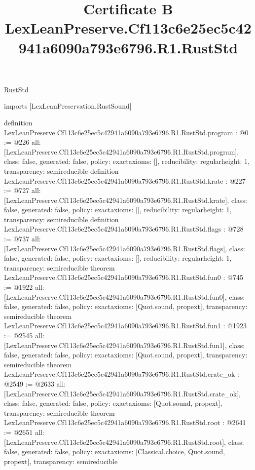 \begin{lexlean}{RustStd}
\title{Certificate B LexLeanPreserve.Cf113c6e25ec5c42941a6090a793e6796.R1.RustStd}
\begin{coremodule}
imports [LexLeanPreservation.RustSound]

definition LexLeanPreserve.Cf113c6e25ec5c42941a6090a793e6796.R1.RustStd.program : @0 := @226 {
  all: [LexLeanPreserve.Cf113c6e25ec5c42941a6090a793e6796.R1.RustStd.program],
  class: false,
  generated: false,
  policy: exact{axioms: []},
  reducibility: regular{height: 1},
  transparency: semireducible
}
definition LexLeanPreserve.Cf113c6e25ec5c42941a6090a793e6796.R1.RustStd.krate : @227 := @727 {
  all: [LexLeanPreserve.Cf113c6e25ec5c42941a6090a793e6796.R1.RustStd.krate],
  class: false,
  generated: false,
  policy: exact{axioms: []},
  reducibility: regular{height: 1},
  transparency: semireducible
}
definition LexLeanPreserve.Cf113c6e25ec5c42941a6090a793e6796.R1.RustStd.flags : @728 := @737 {
  all: [LexLeanPreserve.Cf113c6e25ec5c42941a6090a793e6796.R1.RustStd.flags],
  class: false,
  generated: false,
  policy: exact{axioms: []},
  reducibility: regular{height: 1},
  transparency: semireducible
}
theorem LexLeanPreserve.Cf113c6e25ec5c42941a6090a793e6796.R1.RustStd.fun0 : @745 := @1922 {
  all: [LexLeanPreserve.Cf113c6e25ec5c42941a6090a793e6796.R1.RustStd.fun0],
  class: false,
  generated: false,
  policy: exact{axioms: [Quot.sound, propext]},
  transparency: semireducible
}
theorem LexLeanPreserve.Cf113c6e25ec5c42941a6090a793e6796.R1.RustStd.fun1 : @1923 := @2545 {
  all: [LexLeanPreserve.Cf113c6e25ec5c42941a6090a793e6796.R1.RustStd.fun1],
  class: false,
  generated: false,
  policy: exact{axioms: [Quot.sound, propext]},
  transparency: semireducible
}
theorem LexLeanPreserve.Cf113c6e25ec5c42941a6090a793e6796.R1.RustStd.crate_ok : @2549 := @2633 {
  all: [LexLeanPreserve.Cf113c6e25ec5c42941a6090a793e6796.R1.RustStd.crate_ok],
  class: false,
  generated: false,
  policy: exact{axioms: [Quot.sound, propext]},
  transparency: semireducible
}
theorem LexLeanPreserve.Cf113c6e25ec5c42941a6090a793e6796.R1.RustStd.root : @2641 := @2651 {
  all: [LexLeanPreserve.Cf113c6e25ec5c42941a6090a793e6796.R1.RustStd.root],
  class: false,
  generated: false,
  policy: exact{axioms: [Classical.choice, Quot.sound, propext]},
  transparency: semireducible
}


\end{coremodule}
\end{lexlean}
